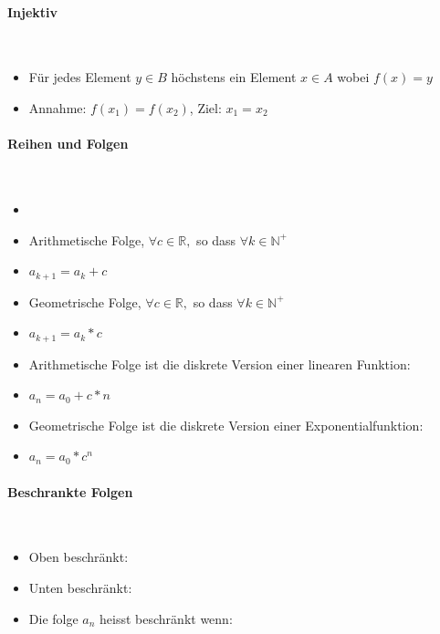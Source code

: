 \paragraph{Injektiv}\mbox{}\\
\begin{itemize}
    \item Für jedes Element $y\in B$ höchstens ein Element $x\in A$ wobei $f(x)=y$
    \item Annahme: $f(x_1) = f(x_2)$, Ziel: $x_1 = x_2$
\end{itemize}
\vspace{1mm}

\paragraph{Reihen und Folgen}\mbox{}\\
\begin{itemize}
    \item {}
    \item Arithmetische Folge, $\forall c \in \mathbb{R},$ so dass $\forall k \in \mathbb{N}^{+}$
    \item $a_{k+1} = a_{k} + c$
    \item Geometrische Folge, $\forall c \in \mathbb{R},$ so dass $\forall k \in \mathbb{N}^{+}$
    \item $a_{k+1} = a_{k} * c$
    \item Arithmetische Folge ist die diskrete Version einer linearen Funktion:
    \item $a_n = a_0 + c * n$
    \item Geometrische Folge ist die diskrete Version einer Exponentialfunktion:
    \item $a_n= a_0 * c^n$ \\
\end{itemize}
\vspace{1mm}

\paragraph{Beschrankte Folgen}\mbox{}\\
\begin{itemize}
    \item Oben beschränkt: 
    \item Unten beschränkt: 
    \item Die folge $a_n$ heisst beschränkt wenn: 
\end{itemize}
\vspace{1mm}

